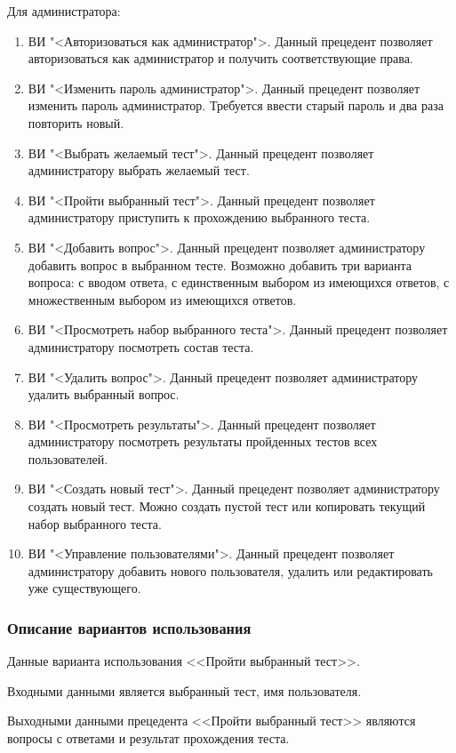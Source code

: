 Для администратора:
\begin{enumerate}
	\item ВИ "<Авторизоваться как администратор">. Данный прецедент позволяет авторизоваться как администратор и получить соответствующие права.
	\item ВИ "<Изменить пароль администратор">. Данный прецедент позволяет изменить пароль администратор. Требуется ввести старый пароль и два раза повторить новый.
	\item ВИ "<Выбрать желаемый тест">. Данный прецедент позволяет администратору выбрать желаемый тест.
	\item ВИ "<Пройти выбранный тест">. Данный прецедент позволяет администратору приступить к прохождению выбранного теста.
	\item ВИ "<Добавить вопрос">. Данный прецедент позволяет администратору добавить вопрос в выбранном тесте. Возможно добавить три варианта вопроса: с вводом ответа, с единственным выбором из имеющихся ответов, с множественным выбором из имеющихся ответов.
	\item ВИ "<Просмотреть набор выбранного теста">. Данный прецедент позволяет администратору посмотреть состав теста.
	\item ВИ "<Удалить вопрос">. Данный прецедент позволяет администратору удалить выбранный вопрос.
	\item ВИ "<Просмотреть результаты">. Данный прецедент позволяет администратору посмотреть результаты пройденных тестов всех пользователей.
	\item ВИ "<Создать новый тест">. Данный прецедент позволяет администратору создать новый тест. Можно создать пустой тест или копировать текущий набор выбранного теста.
	\item ВИ "<Управление пользователями">. Данный прецедент позволяет администратору добавить нового пользователя, удалить или редактировать уже существующего.
\end{enumerate}

\subsubsection{Описание вариантов использования}

Данные варианта использования <<Пройти выбранный тест>>.

Входными данными является выбранный тест, имя пользователя.

Выходными данными прецедента <<Пройти выбранный тест>> являются вопросы с ответами и результат прохождения теста.

